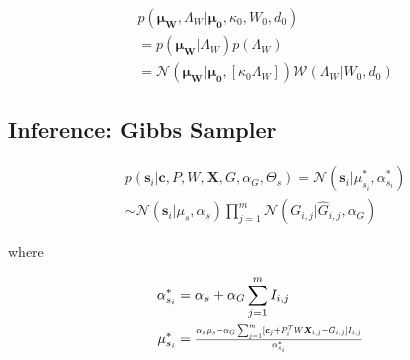 \documentclass[10pt]{proc}
\begin{document}
\begin{align}
    &p(\bm{\mu_W}, \Lambda_W | \bm{\mu_0}, \kappa_0, W_0, d_0) \\
        & = p(\bm{\mu_W} | \Lambda_W) p(\Lambda_W) \\
        & = \mathcal{N}(\bm{\mu_W} | \bm{\mu_0}, [\kappa_0 \Lambda_W])
            \mathcal{W}(\Lambda_W | W_0, d_0)
\end{align}


\subsection{Inference: Gibbs Sampler}

\begin{mdframed}[style=eqbox]
\begin{align} \label{eqn:cpd-s}
    &p(\bm{s}_i | \bm{c}, P, W, \bm{X}, G, \alpha_G, \Theta_s)
        = \mathcal{N}(\bm{s}_i | \mu_{s_i}^*, \alpha_{s_i}^*) \\
        & \sim \mathcal{N}(\bm{s}_i | \mu_s, \alpha_s)
               \prod_{j=1}^m \mathcal{N}(G_{i,j} | \hat{G}_{i,j}, \alpha_G)
\end{align}

where

\begin{align}
    \alpha_{s_i}^* &= \begin{aligned}[t]
        \alpha_s + \alpha_G \sum_{j=1}^m I_{i,j}
    \end{aligned}\\
%
    \mu_{s_i}^* &= \begin{aligned}[t]
        \hstretch{0.8}{\vstretch{0.9}{
            \frac{\alpha_s\mu_s -
                  \alpha_G \sum_{j=1}^m
                      [\bm{c}_j + P_i^TW\bm{X}_{i,j} - G_{i,j} ] I_{i,j}}
                 {\alpha_{s_i}^*}}}
    \end{aligned}
\end{align}
\end{mdframed}
\end{document}
